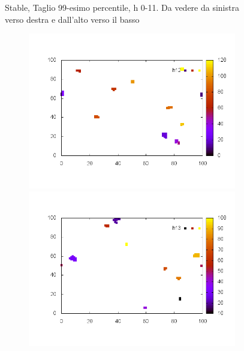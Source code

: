 \documentclass[10pt,a4paper]{article}
\begin{document}
\begin{figure}
\begin{subfigure}[b]{1\textwidth}
\end{subfigure}
\caption{Stable, Taglio 99-esimo percentile, h 0-11. Da vedere da sinistra verso destra e dall'alto verso il basso}
\end{figure}


\begin{figure}
\centering

\begin{subfigure}[b]{1\textwidth}
\includegraphics[scale=.3]{./img/SCC_Stable3/cut99p/12.png}
\includegraphics[scale=.3]{./img/SCC_Stable3/cut99p/13.png}

\end{subfigure}
\end{figure}
\end{document}
